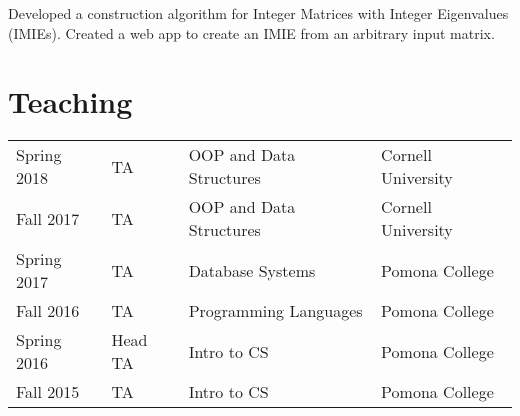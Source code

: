 \documentclass[]{deedy-resume-openfont}
\begin{document}
\begin{minipage}[t]{0.66\textwidth}
Developed a construction algorithm for Integer Matrices with Integer Eigenvalues (IMIEs). Created a web app to create an IMIE from an arbitrary input matrix.
\sectionsep











\section{Teaching} 

\begin{tabular}{llll}
  
    Spring 2018 & TA & OOP and Data Structures & Cornell University \\
  
    Fall 2017 & TA & OOP and Data Structures & Cornell University \\
  
    Spring 2017 & TA & Database Systems & Pomona College \\
  
    Fall 2016 & TA & Programming Languages & Pomona College \\
  
    Spring 2016 & Head TA & Intro to CS & Pomona College \\
  
    Fall 2015 & TA & Intro to CS & Pomona College \\
  
\end{tabular}


\sectionsep

\end{minipage} 
\end{document}
